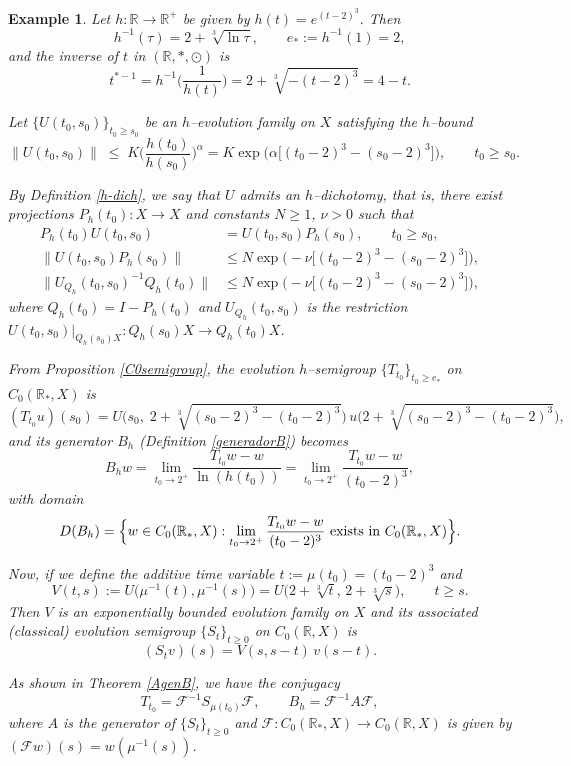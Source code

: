 \documentclass[10pt]{amsart}
\newtheorem{example}{Example}
\numberwithin{equation}{section}
\begin{document}
\begin{example}
    Let $h:\mathbb R\to \mathbb{R}^+$ be given by $
h(t)=e^{(t-2)^3}.$ 
Then
\[
h^{-1}(\tau)=2+\sqrt[3]{\ln \tau},\qquad e_*:=h^{-1}(1)=2,
\]
and the inverse of $t$ in $(\mathbb R,*,\odot)$ is
\[
t^{*-1}=h^{-1}\!\Big(\frac{1}{h(t)}\Big)
=2+\sqrt[3]{-(t-2)^3}=4-t.
\]

Let $\{U(t_0,s_0)\}_{t_0\ge s_0}$ be an $h$–evolution family on $X$ satisfying the $h$–bound
\[
\|U(t_0,s_0)\|
\;\le\;K\Big(\frac{h(t_0)}{h(s_0)}\Big)^{\alpha}
=K\exp\!\big(\alpha\big[(t_0-2)^3-(s_0-2)^3\big]\big),
\qquad t_0\ge s_0.
\]

By Definition \ref{h-dich}, we say that $U$ admits an $h$–dichotomy, that is, there exist projections $P_h(t_0):X\to X$ and constants $N\ge1$, $\nu>0$ such that
\begin{align*}
P_h(t_0)U(t_0,s_0)&=U(t_0,s_0)P_h(s_0),\qquad t_0\ge s_0,\\[1mm]
\|U(t_0,s_0)P_h(s_0)\|
&\le N\exp\!\big(-\nu\big[(t_0-2)^3-(s_0-2)^3\big]\big),\\[1mm]
\|U_{Q_h}(t_0,s_0)^{-1}Q_h(t_0)\|
&\le N\exp\!\big(-\nu\big[(t_0-2)^3-(s_0-2)^3\big]\big),
\end{align*}
where $Q_h(t_0)=I-P_h(t_0)$ and $U_{Q_h}(t_0,s_0)$ is the restriction 
$U(t_0,s_0)\big|_{Q_h(s_0)X}:Q_h(s_0)X\to Q_h(t_0)X$.

  From Proposition \ref{C0semigroup}, the evolution $h$–semigroup $\{T_{t_0}\}_{t_0\ge e_*}$ on
$C_0(\mathbb R_*,X)$ is 
\[(T_{t_0}u)(s_0)
=U\Big(s_0,\;2+\sqrt[3]{(s_0-2)^3-(t_0-2)^3}\Big)\,
u\Big(2+\sqrt[3]{(s_0-2)^3-(t_0-2)^3}\Big),
\]
and its generator $B_h$ (Definition \ref{generadorB}) becomes
\[
B_h w
=\lim_{t_0\to 2^+}
\frac{T_{t_0}w-w}{\ln(h(t_0))}
=\lim_{t_0\to 2^+}
\frac{T_{t_0}w-w}{(t_0-2)^3},
\]
with domain
\[
D(B_h)=\Bigl\{w\in C_0(\mathbb R_*,X):
\lim_{t_0\to 2^+}\frac{T_{t_0}w-w}{(t_0-2)^3}\ \text{exists in }C_0(\mathbb R_*,X)\Bigr\}.
\]

Now, if we define the additive time variable $t:=\mu(t_0)=(t_0-2)^3$ and
\[
V(t,s):=U\big(\mu^{-1}(t),\mu^{-1}(s)\big)
=U\big(2+\sqrt[3]{t},\,2+\sqrt[3]{s}\big),\qquad t\ge s.
\]
Then $V$ is an exponentially bounded evolution family on $X$ and its associated
(classical) evolution semigroup $\{S_t\}_{t\ge0}$ on $C_0(\mathbb R,X)$ is
\[
(S_t v)(s)
=V(s,s-t)\,v(s-t).
\]

As shown in Theorem \ref{AgenB}, we have the conjugacy
\[
T_{t_0}
=\mathcal{F}^{-1}S_{\mu(t_0)} \mathcal{F},\qquad
B_h=\mathcal{F}^{-1} A \mathcal{F},
\]
where $A$ is the generator of $\{S_t\}_{t\ge0}$ and
$\mathcal{F}: C_0(\mathbb R_*,X)\to C_0(\mathbb R,X)$ is given by $(\mathcal{F}w)(s)=w(\mu^{-1}(s))$.


\end{example}
\end{document}
